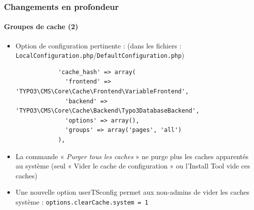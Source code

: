 \begin{frame}[fragile]
	\frametitle{Changements en profondeur}
	\framesubtitle{Groupes de cache (2)}

	\lstset{
		basicstyle=\tiny\ttfamily
	}

	\begin{itemize}

		\item Option de configuration pertinente :\newline
			\smaller(dans les fichiers : \texttt{LocalConfiguration.php}/\texttt{DefaultConfiguration.php})\normalsize

			\begin{lstlisting}
			'cache_hash' => array(
			  'frontend' => 'TYPO3\CMS\Core\Cache\Frontend\VariableFrontend',
			  'backend' => 'TYPO3\CMS\Core\Cache\Backend\Typo3DatabaseBackend',
			  'options' => array(),
			  'groups' => array('pages', 'all')
			),
			\end{lstlisting}

		\item La commande « \textit{Purger tous les caches} » ne purge plus les caches apparentés au système (seul « Vider le cache de configuration » ou l'Install Tool vide ces caches)
		\item Une nouvelle option userTSconfig permet aux non-admins de vider les caches système :\newline
			\smaller\texttt{options.clearCache.system = 1}\normalsize

		\breakingchange

	\end{itemize}

\end{frame}


